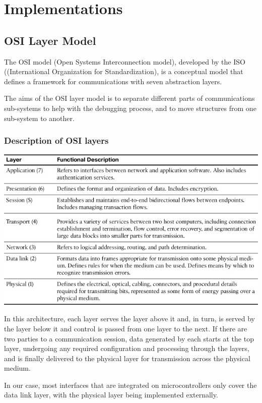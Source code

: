 \documentclass[a4paper, twoside]{report}
\begin{document}
\newpage
\chapter{Implementations}
\section{OSI Layer Model}\label{osi layer model}
\noindent The OSI model (Open Systems Interconnection model), developed by the ISO ((International Organization for Standardization), is a conceptual model that defines a framework for communications with seven abstraction layers. \\ \par
\noindent The aims of the OSI layer model is to separate different parts of communications sub-systems to help with the debugging process, and to move structures from one sub-system to another.  \\ \par

\subsection{Description of OSI layers}
\vspace{2mm} %
\begin{center}
\includegraphics[scale=0.8]{OSI.jpg}
\end{center}
\vspace{2mm} %
\noindent In this architecture, each layer serves the layer above it and, in turn, is served by the layer below it and control is passed from one layer to the next. If there are two parties to a communication session, data generated by each starts at the top layer, undergoing any required configuration and processing through the layers, and is finally delivered to the physical layer for transmission across the physical medium. \\ \par
\noindent In our case, most interfaces that are integrated on microcontrollers only cover the data link layer, with the physical layer being implemented externally. \\ \par
\newpage
\end{document}
